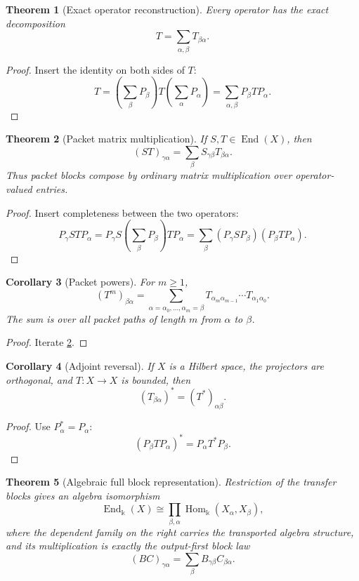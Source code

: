 \documentclass[11pt]{article}
\newtheorem{theorem}{Theorem}[section]
\newtheorem{corollary}[theorem]{Corollary}
\theoremstyle{definition}
\theoremstyle{remark}
\newcommand{\End}{\operatorname{End}}
\newcommand{\Hom}{\operatorname{Hom}}
\newcommand{\bbk}{\mathbb{k}}
\begin{document}
\begin{theorem}[Exact operator reconstruction]
\label{thm:operator-reconstruction}
Every operator has the exact decomposition
\[
\boxed{
T=\sum_{\alpha,\beta}T_{\beta\alpha}.
}
\]
\end{theorem}

\begin{proof}
Insert the identity on both sides of $T$:
\[
T
=
\left(\sum_{\beta}P_{\beta}\right)
T
\left(\sum_{\alpha}P_{\alpha}\right)
=
\sum_{\alpha,\beta}P_{\beta}TP_{\alpha}.
\]
\end{proof}

\begin{theorem}[Packet matrix multiplication]
\label{thm:block-composition}
If $S,T\in\End(X)$, then
\[
\boxed{
(ST)_{\gamma\alpha}
=
\sum_{\beta}S_{\gamma\beta}T_{\beta\alpha}.
}
\]
Thus packet blocks compose by ordinary matrix multiplication over operator-valued entries.
\end{theorem}

\begin{proof}
Insert completeness between the two operators:
\[
P_{\gamma}STP_{\alpha}
=
P_{\gamma}S
\left(\sum_{\beta}P_{\beta}\right)
TP_{\alpha}
=
\sum_{\beta}
(P_{\gamma}SP_{\beta})(P_{\beta}TP_{\alpha}).
\]
\end{proof}

\begin{corollary}[Packet powers]
\label{cor:packet-powers}
For $m\ge1$,
\[
(T^m)_{\beta\alpha}
=
\sum_{\alpha=\alpha_0,\ldots,\alpha_m=\beta}
T_{\alpha_m\alpha_{m-1}}
\cdots
T_{\alpha_1\alpha_0}.
\]
The sum is over all packet paths of length $m$ from $\alpha$ to $\beta$.
\end{corollary}

\begin{proof}
Iterate \cref{thm:block-composition}.
\end{proof}

\begin{corollary}[Adjoint reversal]
\label{cor:adjoint-reversal}
If $X$ is a Hilbert space, the projectors are orthogonal, and $T:X\to X$ is bounded, then
\[
(T_{\beta\alpha})^*=(T^*)_{\alpha\beta}.
\]
\end{corollary}

\begin{proof}
Use $P_{\alpha}^*=P_{\alpha}$:
\[
(P_{\beta}TP_{\alpha})^*=P_{\alpha}T^*P_{\beta}.
\]
\end{proof}

\begin{theorem}[Algebraic full block representation]
\label{thm:block-algebra}
Restriction of the transfer blocks gives an algebra isomorphism
\[
\boxed{
\End_{\bbk}(X)
\cong
\prod_{\beta,\alpha}\Hom_{\bbk}(X_{\alpha},X_{\beta}),
}
\]
where the dependent family on the right carries the transported algebra structure, and its multiplication is exactly the output-first block law
\[
(BC)_{\gamma\alpha}=\sum_{\beta}B_{\gamma\beta}C_{\beta\alpha}.
\]
\end{theorem}
\end{document}
